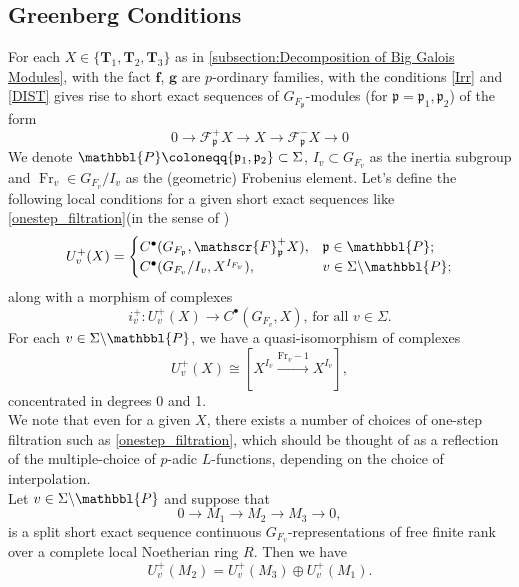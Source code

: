 \documentclass[10pt]{amsart}
\numberwithin{equation}{section}
\theoremstyle{definition}
\theoremstyle{remark} %
\newcommand{\ba}{\backslash}
\newcommand{\fr}{\mathrm{Fr}}
\newcommand{\f}{\mathbf{f}}
\newcommand{\scrF}{\mathscr{F}}
\newcommand{\g}{\mathbf{g}}
\newcommand{\p}{\mathfrak{p}}
\newcommand{\bP}{\mathbbl{P}}
\newcommand{\T}{\mathbf{T}}
\begin{document}
	\subsection{Greenberg Conditions}
	\label{sec:greenberg}
	For each $ X \in \{\T_1, \T_2,\T_3 \} $ as in \textsection\ref{subsection:Decomposition of Big Galois Modules}, with the fact $ \f $, $ \g $ are $p$-ordinary families, with the conditions \ref{Irr} and \ref{DIST} gives rise to short exact sequences of $ G_{F_\p} $-modules (for $ \p = \p_1,\p_2 $) of the form
	\begin{equation}
		\label{onestep_filtration}
		0 \rightarrow \scrF^+_{\p} X \rightarrow X \rightarrow \scrF^-_{\p} X \rightarrow 0 
	\end{equation}
	We denote $ \bP\coloneqq \{\p_1,\p_2\} \subset \Sigma $, $ I_v \subset G_{F_v} $ as the inertia subgroup and $ \operatorname{Fr}_v \in G_{F_v}/I_v $ as the (geometric) Frobenius element. Let's define the following local conditions for a given short exact sequences like \eqref{onestep_filtration}(in the sense of \cite{Nek06})
	$$ 
	U_{v}^+(X) =
	\begin{cases}
		C^{\bullet}(G_{F_\p},\scrF^+_{\p} X), & \p \in \bP; \\
		C^{\bullet}(G_{F_v}/I_v,X^{I_{F_{v}}}), & v \in \Sigma \ba \bP ;
	\end{cases}
	$$
	along with a morphism of complexes 
	$$ i_{v}^+ \colon U_{v}^+(X) \rightarrow C^{\bullet}(G_{F_v},X) \text{, for all } v \in \Sigma. $$
	For each $ v \in \Sigma\ba \bP $, we have a quasi-isomorphism of complexes 
	$$ U_{v}^+(X) \cong \left[ X^{I_v} \xrightarrow{\fr_v - 1} X^{I_v} \right], $$
	concentrated in degrees 0 and 1.\\
	We note that even for a given $ X $, there exists a number of choices of one-step filtration such as \eqref{onestep_filtration}, which should be thought of as a reflection of the multiple-choice of $ p $-adic $ L $-functions, depending on the choice of interpolation. \\
	Let $ v \in \Sigma\ba \bP $ and suppose that 
	$$ 0 \rightarrow M_1 \rightarrow M_2 \rightarrow M_3 \rightarrow 0, $$
	is a split short exact sequence continuous $ G_{F_v} $-representations of free finite rank over a complete local Noetherian ring $ R $. Then we have 
	\begin{equation}
		U_{v}^+(M_2) = U_{v}^+(M_3) \oplus U_{v}^+(M_1).
	\end{equation}
\end{document}
